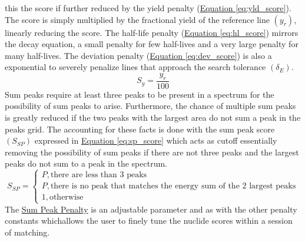 \documentclass[12pt,report,justified]{SANDreport}
\begin{document}
this the score if further reduced by the yield penalty (\hyperref[eq:yld_score]{Equation \ref{eq:yld_score}}). 
The score is simply multiplied by the fractional yield of the reference line \(\left( y_r\right)\), linearly 
reducing the score. The half-life penalty (\hyperref[eq:hl_score]{Equation \ref{eq:hl_score}}) mirrors the 
decay equation, a small penalty for few half-lives and a very large penalty for many half-lives. The deviation 
penalty (\hyperref[eq:dev_score]{Equation \ref{eq:dev_score}}) is also a exponential to severely penalize
lines that approach the search tolerance \(\left( \delta _E \right)\).
\begin{equation}
S_y = \frac{y_r}{100}
\label{eq:yld_score}
\end{equation}
Sum peaks require at least three peaks to be present in a spectrum for the possibility of sum peaks
to arise. Furthermore, the chance of multiple sum peaks is greatly reduced if the two peaks with
the largest area do not sum a peak in the peaks grid. The accounting for these facts is done with
the sum peak score \(\left( S_{SP} \right)\) expressed in \hyperref[eq:sp_score]{Equation \ref{eq:sp_score}} 
which acts as cutoff essentially removing the possibility of sum peaks if there are not three peaks and the 
largest peaks do not sum to a peak in the spectrum.
\begin{equation}
S_{SP} = 
\begin{cases}
P, \text{there are less than 3 peaks} \\
P, \text{there is no peak that matches the energy sum of the 2 largest peaks} \\
1, \text{otherwise}
\end{cases}
\label{eq:sp_score}
\end{equation}
The \hyperref[itm:sm_peak_pen]{Sum Peak Penalty} is an adjustable parameter and as with the other
penalty constants whichallows the user to finely tune the nuclide scores within a session of matching.
        
\end{document}
